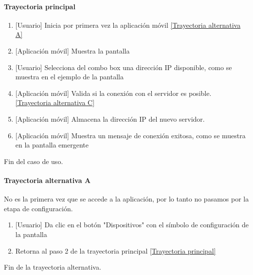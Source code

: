 \begin{longtable}{|J{5cm}|J{10.3cm}|}
\end{longtable}

\paragraph{Trayectoria principal} \label{SUB-U-CU1.7:TPr}
	\begin{enumerate}
		\item {[Usuario]} Inicia por primera vez la aplicación móvil \hyperref[SUB-U-CU1.7:TA]{[Trayectoria alternativa A]} 
		\item {[Aplicación móvil]} Muestra la pantalla %
		\item  {[Usuario]} Selecciona del combo box una dirección IP disponible, como se muestra en el ejemplo de la pantalla %
		\item {[Aplicación móvil]} Valida si la conexión con el servidor es posible. \hyperref[SUB-U-CU1.7:TC]{[Trayectoria alternativa C]}
		\item {[Aplicación móvil]} Almacena la dirección IP del nuevo servidor.
		\item {[Aplicación móvil]} Muestra un mensaje de conexión exitosa, como se muestra en la pantalla emergente %
	\end{enumerate}
	Fin del caso de uso.

\paragraph{Trayectoria alternativa A} \label{SUB-U-CU1.7:TA}
	No es la primera vez que se accede a la aplicación, por lo tanto no pasamos por la etapa de configuración.
	\begin{enumerate}[label=A\arabic*.]
		\item {[Usuario]} Da clic en el botón "Dispositivos" con el símbolo de configuración de la pantalla %
		\item Retorna al paso 2 de la trayectoria principal \hyperref[SUB-U-CU1.7:TPr]{[Trayectoria principal]}
	\end{enumerate}
	Fin de la trayectoria alternativa.
	
